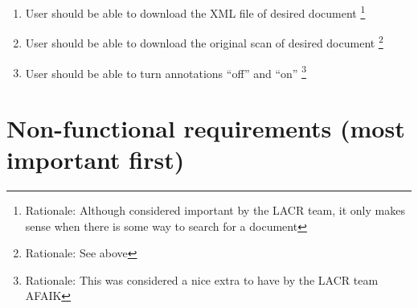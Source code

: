 \documentclass[10pt,a4paper]{report}
\begin{document}
\begin{enumerate}
            \item User should be able to download the XML file of desired document
            \footnote{Rationale: Although considered important by the LACR team, it only makes sense when there is some way to search for a document}
            
            \item User should be able to download the original scan of desired document
            \footnote{Rationale: See above}
             
            \item User should be able to turn annotations “off” and “on”
            \footnote{Rationale: This was considered a nice extra to have by the LACR team AFAIK}
        \end{enumerate}
    \section*{Non-functional requirements (most important first)}
\end{document}
